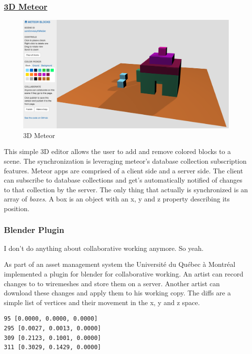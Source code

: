 \subsubsection{\texorpdfstring{\href{http://3d.meteor.com/}{3D
Meteor}}{3D Meteor}}\label{d-meteor0}

\begin{figure}[htbp]
  \centering
  \includegraphics[width=12cm]{../assets/3dmeteor.png}
  \caption{3D Meteor}
	\label{fig:3dmeteor}
\end{figure}

This simple 3D editor allows the user to add and remove colored blocks
to a scene. The synchronization is leveraging meteor's database
collection subscription features. Meteor apps are comprised of a client
side and a server side. The client can subscribe to database collections
and get's automatically notified of changes to that collection by the
server. The only thing that actually is synchronized is an array of
\emph{boxes}. A box is an object with an x, y and z property describing
its position.

\subsubsection{Blender Plugin}
\label{blender-plugin}

I don't do anything about collaborative working anymore. So yeah.

As part of an asset management system the Université du Québec à
Montréal implemented a plugin for blender for collaborative working. An
artist can record changes to to wiremeshes and store them on a server.
Another artist can download these changes and apply them to his working
copy. The diffs are a simple list of vertices and their movement in the
x, y and z space. \cite{LCR07}

\begin{verbatim}
95 [0.0000, 0.0000, 0.0000]
295 [0.0027, 0.0013, 0.0000]
309 [0.2123, 0.1001, 0.0000]
311 [0.3029, 0.1429, 0.0000]
\end{verbatim}

